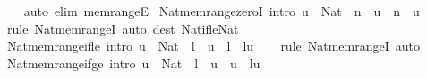 \begin{isabellebody}
%
\isadelimproof
\ \ %
\endisadelimproof
%
\isatagproof
{}\isamarkupfalse%
\ {\isacharparenleft}{\kern0pt}auto\ elim{\isacharcolon}{\kern0pt}\ mem{\isacharunderscore}{\kern0pt}rangeE{\isacharparenright}{\kern0pt}%
\endisatagproof
{\isafoldproof}%
%
\isadelimproof
\isanewline
%
\endisadelimproof
\isanewline
{}\isamarkupfalse%
\ Nat{\isacharunderscore}{\kern0pt}mem{\isacharunderscore}{\kern0pt}range{\isacharunderscore}{\kern0pt}zeroI\ {\isacharbrackleft}{\kern0pt}intro{\isacharbrackright}{\kern0pt}{\isacharcolon}{\kern0pt}\ {\isachardoublequoteopen}u\ {\isacharcolon}{\kern0pt}\ Nat\ {\isasymLongrightarrow}\ n\ {\isasymle}\ u\ {\isasymLongrightarrow}\ n\ {\isasymin}\ {\isacharbrackleft}{\kern0pt}{}{\isacharcomma}{\kern0pt}{\isasymdots}{\isacharcomma}{\kern0pt}u{\isacharbrackright}{\kern0pt}{\isachardoublequoteclose}\isanewline
%
\isadelimproof
\ \ %
\endisadelimproof
%
\isatagproof
{}\isamarkupfalse%
\ {\isacharparenleft}{\kern0pt}rule\ Nat{\isacharunderscore}{\kern0pt}mem{\isacharunderscore}{\kern0pt}rangeI{\isacharparenright}{\kern0pt}\ {\isacharparenleft}{\kern0pt}auto\ dest{\isacharcolon}{\kern0pt}\ Nat{\isacharunderscore}{\kern0pt}if{\isacharunderscore}{\kern0pt}le{\isacharunderscore}{\kern0pt}Nat{\isacharparenright}{\kern0pt}%
\endisatagproof
{\isafoldproof}%
%
\isadelimproof
\isanewline
%
\endisadelimproof
\isanewline
{}\isamarkupfalse%
\ Nat{\isacharunderscore}{\kern0pt}mem{\isacharunderscore}{\kern0pt}range{\isacharunderscore}{\kern0pt}if{\isacharunderscore}{\kern0pt}le\ {\isacharbrackleft}{\kern0pt}intro{\isacharbrackright}{\kern0pt}{\isacharcolon}{\kern0pt}\ {\isachardoublequoteopen}u\ {\isacharcolon}{\kern0pt}\ Nat\ {\isasymLongrightarrow}\ l\ {\isasymle}\ u\ {\isasymLongrightarrow}\ l\ {\isasymin}\ {\isacharbrackleft}{\kern0pt}l{\isacharcomma}{\kern0pt}{\isasymdots}{\isacharcomma}{\kern0pt}u{\isacharbrackright}{\kern0pt}{\isachardoublequoteclose}\isanewline
%
\isadelimproof
\ \ %
\endisadelimproof
%
\isatagproof
{}\isamarkupfalse%
\ {\isacharparenleft}{\kern0pt}rule\ Nat{\isacharunderscore}{\kern0pt}mem{\isacharunderscore}{\kern0pt}rangeI{\isacharparenright}{\kern0pt}\ auto%
\endisatagproof
{\isafoldproof}%
%
\isadelimproof
\isanewline
%
\endisadelimproof
\isanewline
{}\isamarkupfalse%
\ Nat{\isacharunderscore}{\kern0pt}mem{\isacharunderscore}{\kern0pt}range{\isacharunderscore}{\kern0pt}if{\isacharunderscore}{\kern0pt}ge\ {\isacharbrackleft}{\kern0pt}intro{\isacharbrackright}{\kern0pt}{\isacharcolon}{\kern0pt}\ {\isachardoublequoteopen}u\ {\isacharcolon}{\kern0pt}\ Nat\ {\isasymLongrightarrow}\ l\ {\isasymle}\ u\ {\isasymLongrightarrow}\ u\ {\isasymin}\ {\isacharbrackleft}{\kern0pt}l{\isacharcomma}{\kern0pt}{\isasymdots}{\isacharcomma}{\kern0pt}u{\isacharbrackright}{\kern0pt}{\isachardoublequoteclose}\isanewline

\end{isabellebody}

